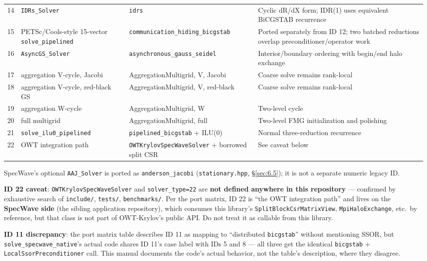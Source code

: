 \documentclass[11pt,a4paper]{report}
\newcommand{\secref}[1]{\S\ref{#1}}
\begin{document}
\begin{longtable}{C{0.06\textwidth}P{0.26\textwidth}P{0.28\textwidth}P{0.28\textwidth}}
14 & \lstinline!IDRs_Solver! & \lstinline!idrs! & Cyclic dR/dX form; IDR(1) uses equivalent BiCGSTAB recurrence \\
15 & PETSc/Cools-style 15-vector \lstinline!solve_pipelined! & \lstinline!communication_hiding_bicgstab! & Ported separately from ID 12; two batched reductions overlap preconditioner/operator work \\
16 & \lstinline!AsyncGS_Solver! & \lstinline!asynchronous_gauss_seidel! & Interior/boundary ordering with begin/end halo exchange \\
17 & aggregation V-cycle, Jacobi & AggregationMultigrid, V, Jacobi & Coarse solve remains rank-local \\
18 & aggregation V-cycle, red-black GS & AggregationMultigrid, V, red-black & Coarse solve remains rank-local \\
19 & aggregation W-cycle & AggregationMultigrid, W & Two-level cycle \\
20 & full multigrid & AggregationMultigrid, full & Two-level FMG initialization and polishing \\
21 & \lstinline!solve_ilu0_pipelined! & \lstinline!pipelined_bicgstab! + ILU(0) & Normal three-reduction recurrence \\
22 & OWT integration path & \lstinline!OWTKrylovSpecWaveSolver! + borrowed split CSR & See caveat below \\
\bottomrule
\end{longtable}

SpecWave's optional \lstinline!AAJ_Solver! is ported as \lstinline!anderson_jacobi!
(\texttt{stationary.hpp}, \secref{sec:6.5}); it is not a separate
numeric legacy ID.

\textbf{ID 22 caveat}: \lstinline!OWTKrylovSpecWaveSolver! and
\lstinline!solver_type=22! are \textbf{not defined anywhere in this
repository} --- confirmed by exhaustive search of \texttt{include/},
\texttt{tests/}, \texttt{benchmarks/}. Per the port matrix, ID 22 is
``the OWT integration path'' and lives on the \textbf{SpecWave side}
(the sibling application repository), which consumes this library's
\lstinline!SplitBlockCsrMatrixView!, \lstinline!MpiHaloExchange!, etc.\ by
reference, but that class is not part of OWT-Krylov's public API. Do
not treat it as callable from this library.

\textbf{ID 11 discrepancy}: the port matrix table describes ID 11 as
mapping to ``distributed \lstinline!bicgstab!'' without mentioning SSOR, but
\lstinline!solve_specwave_native!'s actual code shares ID 11's case label
with IDs 5 and 8 --- all three get the identical \lstinline!bicgstab! +
\lstinline!LocalSsorPreconditioner! call. This manual documents the code's
actual behavior, not the table's description, where they disagree.
\end{document}
